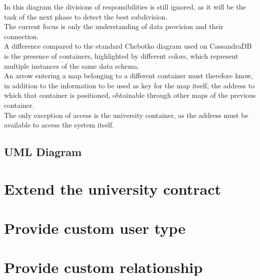 \documentclass[ManualeSviluppatore.tex]{subfiles}
\begin{document}
In this diagram the divisions of responsibilities is still ignored, as it will be the task of the next phase to detect the best subdivision.\\
The current focus is only the understanding of data provision and their connection.\\

A difference compared to the standard Chebotko diagram used on CassandraDB is the presence of containers, highlighted by different colors, which represent multiple instances of the same data schema.\\
An arrow entering a map belonging to a different container must therefore know, in addition to the information to be used as key for the map itself, the address to which that container is positioned, obtainable through other maps of the previous container.\\
The only exception of access is the university container, as the address must be available to access the system itself.\\

\subsection{UML Diagram}

\section{Extend the university contract}
\section{Provide custom user type}
\section{Provide custom relationship}
\end{document}
